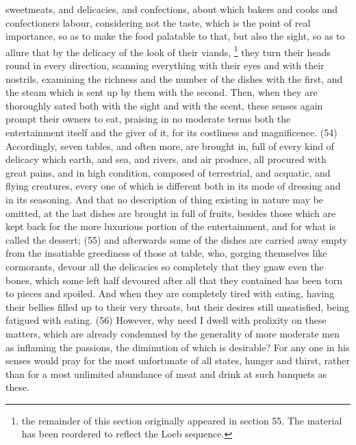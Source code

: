 sweetmeats, and delicacies, and confections, about which bakers and cooks and confectioners
labour, considering not the taste, which is the point of real importance, so as to make the food
palatable to that, but also the sight, so as to allure that by the delicacy of the look of their
viands, \footnote{the remainder of this section originally appeared in section 55. The material has been reordered to reflect the
Loeb sequence.} they turn their heads round in every direction, scanning everything with their eyes
and with their nostrils, examining the richness and the number of the dishes with the first, and the
steam which is sent up by them with the second. Then, when they are thoroughly sated both with
the sight and with the scent, these senses again prompt their owners to eat, praising in no
moderate terms both the entertainment itself and the giver of it, for its costliness and magnificence.
(54) Accordingly, seven tables, and often more, are brought in, full of every kind of delicacy which
earth, and sea, and rivers, and air produce, all procured with great pains, and in high condition,
composed of terrestrial, and acquatic, and flying creatures, every one of which is different both in
its mode of dressing and in its seasoning. And that no description of thing existing in nature may be
omitted, at the last dishes are brought in full of fruits, besides those which are kept back for the
more luxurious portion of the entertainment, and for what is called the dessert; (55) and afterwards
some of the dishes are carried away empty from the insatiable greediness of those at table, who,
gorging themselves like cormorants, devour all the delicacies so completely that they gnaw even
the bones, which some left half devoured after all that they contained has been torn to pieces and
spoiled. And when they are completely tired with eating, having their bellies filled up to their very
throats, but their desires still unsatisfied, being fatigued with eating. (56) However, why need I dwell
with prolixity on these matters, which are already condemned by the generality of more moderate
men as inflaming the passions, the diminution of which is desirable? For any one in his senses
would pray for the most unfortunate of all states, hunger and thirst, rather than for a most unlimited
abundance of meat and drink at such banquets as these.


